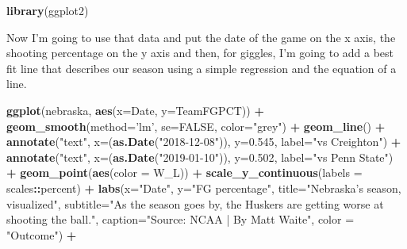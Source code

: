 \documentclass[]{book}
\newenvironment{Shaded}{\begin{snugshade}}{\end{snugshade}}
\newcommand{\KeywordTok}[1]{\textcolor[rgb]{0.13,0.29,0.53}{\textbf{#1}}}
\newcommand{\DataTypeTok}[1]{\textcolor[rgb]{0.13,0.29,0.53}{#1}}
\newcommand{\FloatTok}[1]{\textcolor[rgb]{0.00,0.00,0.81}{#1}}
\newcommand{\StringTok}[1]{\textcolor[rgb]{0.31,0.60,0.02}{#1}}
\newcommand{\OtherTok}[1]{\textcolor[rgb]{0.56,0.35,0.01}{#1}}
\newcommand{\OperatorTok}[1]{\textcolor[rgb]{0.81,0.36,0.00}{\textbf{#1}}}
\newcommand{\NormalTok}[1]{#1}
\begin{document}
\begin{Shaded}
\begin{Highlighting}[]
\KeywordTok{library}\NormalTok{(ggplot2)}
\end{Highlighting}
\end{Shaded}

Now I'm going to use that data and put the date of the game on the x
axis, the shooting percentage on the y axis and then, for giggles, I'm
going to add a best fit line that describes our season using a simple
regression and the equation of a line.

\begin{Shaded}
\begin{Highlighting}[]
\KeywordTok{ggplot}\NormalTok{(nebraska, }\KeywordTok{aes}\NormalTok{(}\DataTypeTok{x=}\NormalTok{Date, }\DataTypeTok{y=}\NormalTok{TeamFGPCT)) }\OperatorTok{+}\StringTok{ }
\StringTok{  }\KeywordTok{geom_smooth}\NormalTok{(}\DataTypeTok{method=}\StringTok{'lm'}\NormalTok{, }\DataTypeTok{se=}\OtherTok{FALSE}\NormalTok{, }\DataTypeTok{color=}\StringTok{"grey"}\NormalTok{) }\OperatorTok{+}\StringTok{ }
\StringTok{  }\KeywordTok{geom_line}\NormalTok{() }\OperatorTok{+}\StringTok{ }
\StringTok{  }\KeywordTok{annotate}\NormalTok{(}\StringTok{"text"}\NormalTok{, }\DataTypeTok{x=}\NormalTok{(}\KeywordTok{as.Date}\NormalTok{(}\StringTok{"2018-12-08"}\NormalTok{)), }\DataTypeTok{y=}\FloatTok{0.545}\NormalTok{, }\DataTypeTok{label=}\StringTok{"vs Creighton"}\NormalTok{) }\OperatorTok{+}\StringTok{ }
\StringTok{  }\KeywordTok{annotate}\NormalTok{(}\StringTok{"text"}\NormalTok{, }\DataTypeTok{x=}\NormalTok{(}\KeywordTok{as.Date}\NormalTok{(}\StringTok{"2019-01-10"}\NormalTok{)), }\DataTypeTok{y=}\FloatTok{0.502}\NormalTok{, }\DataTypeTok{label=}\StringTok{"vs Penn State"}\NormalTok{) }\OperatorTok{+}\StringTok{ }
\StringTok{  }\KeywordTok{geom_point}\NormalTok{(}\KeywordTok{aes}\NormalTok{(}\DataTypeTok{color =}\NormalTok{ W_L)) }\OperatorTok{+}\StringTok{ }
\StringTok{  }\KeywordTok{scale_y_continuous}\NormalTok{(}\DataTypeTok{labels =}\NormalTok{ scales}\OperatorTok{::}\NormalTok{percent) }\OperatorTok{+}\StringTok{ }
\StringTok{  }\KeywordTok{labs}\NormalTok{(}\DataTypeTok{x=}\StringTok{"Date"}\NormalTok{, }\DataTypeTok{y=}\StringTok{"FG percentage"}\NormalTok{, }\DataTypeTok{title=}\StringTok{"Nebraska's season, visualized"}\NormalTok{, }\DataTypeTok{subtitle=}\StringTok{"As the season goes by, the Huskers are getting worse at shooting the ball."}\NormalTok{, }\DataTypeTok{caption=}\StringTok{"Source: NCAA | By Matt Waite"}\NormalTok{, }\DataTypeTok{color =} \StringTok{"Outcome"}\NormalTok{) }\OperatorTok{+}

\end{Highlighting}
\end{Shaded}
\end{document}
